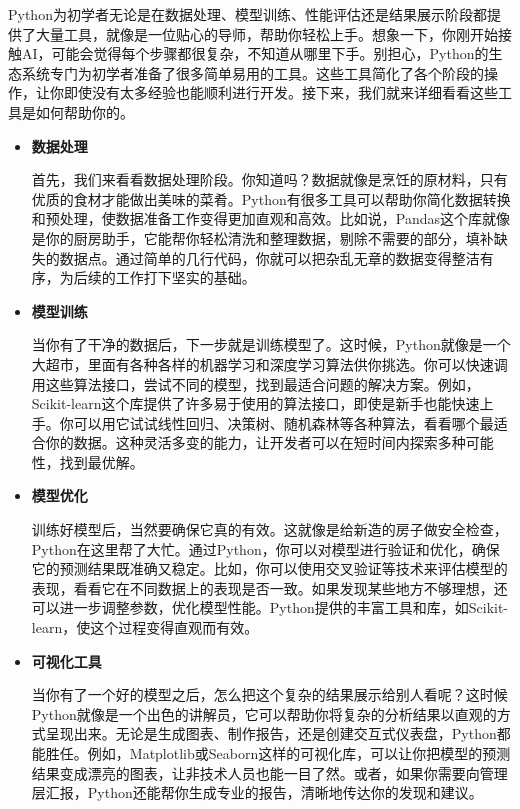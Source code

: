 Python为初学者无论是在数据处理、模型训练、性能评估还是结果展示阶段都提供了大量工具，就像是一位贴心的导师，帮助你轻松上手。想象一下，你刚开始接触AI，可能会觉得每个步骤都很复杂，不知道从哪里下手。别担心，Python的生态系统专门为初学者准备了很多简单易用的工具。这些工具简化了各个阶段的操作，让你即使没有太多经验也能顺利进行开发。接下来，我们就来详细看看这些工具是如何帮助你的。

\begin{itemize}

\item \textbf{数据处理}

首先，我们来看看数据处理阶段。你知道吗？数据就像是烹饪的原材料，只有优质的食材才能做出美味的菜肴。Python有很多工具可以帮助你简化数据转换和预处理，使数据准备工作变得更加直观和高效。比如说，Pandas这个库就像是你的厨房助手，它能帮你轻松清洗和整理数据，剔除不需要的部分，填补缺失的数据点。通过简单的几行代码，你就可以把杂乱无章的数据变得整洁有序，为后续的工作打下坚实的基础。

\item \textbf{模型训练}

当你有了干净的数据后，下一步就是训练模型了。这时候，Python就像是一个大超市，里面有各种各样的机器学习和深度学习算法供你挑选。你可以快速调用这些算法接口，尝试不同的模型，找到最适合问题的解决方案。例如，Scikit-learn这个库提供了许多易于使用的算法接口，即使是新手也能快速上手。你可以用它试试线性回归、决策树、随机森林等各种算法，看看哪个最适合你的数据。这种灵活多变的能力，让开发者可以在短时间内探索多种可能性，找到最优解。

\item \textbf{模型优化}

训练好模型后，当然要确保它真的有效。这就像是给新造的房子做安全检查，Python在这里帮了大忙。通过Python，你可以对模型进行验证和优化，确保它的预测结果既准确又稳定。比如，你可以使用交叉验证等技术来评估模型的表现，看看它在不同数据上的表现是否一致。如果发现某些地方不够理想，还可以进一步调整参数，优化模型性能。Python提供的丰富工具和库，如Scikit-learn，使这个过程变得直观而有效。

\item \textbf{可视化工具}

当你有了一个好的模型之后，怎么把这个复杂的结果展示给别人看呢？这时候Python就像是一个出色的讲解员，它可以帮助你将复杂的分析结果以直观的方式呈现出来。无论是生成图表、制作报告，还是创建交互式仪表盘，Python都能胜任。例如，Matplotlib或Seaborn这样的可视化库，可以让你把模型的预测结果变成漂亮的图表，让非技术人员也能一目了然。或者，如果你需要向管理层汇报，Python还能帮你生成专业的报告，清晰地传达你的发现和建议。


\end{itemize}


